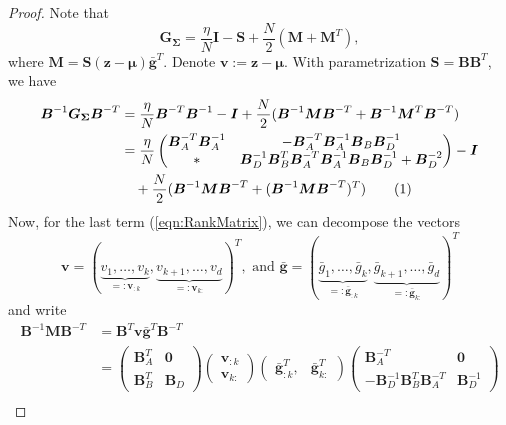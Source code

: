 \documentclass[a4paper, 11pt, oneside]{scrartcl}
\theoremstyle{break}
\newcommand{\matr}[1]{\boldsymbol{#1}}
\newcommand{\numberthis}{\addtocounter{equation}{1}\tag{\theequation}}
\numberwithin{equation}{section}
\begin{document}
					\begin{proof}
						Note that 
						$$\matr{G_{\Sigma}} = \frac{\eta}{N} \matr{I} - \matr{S} + \frac{N}{2} (\matr{M} + \matr{M}^T),$$
						where $\matr{M} = \matr{S} (\matr{z} - \matr{\mu}) \matr{\bar{g}}^T$.
						Denote $\matr{v} := \matr{z} - \matr{\mu}$.
						With parametrization $\matr{S} = \matr{B} \matr{B}^T$, we have
						\begin{align*}
							\matr{B}^{-1} \matr{G_{\Sigma}} \matr{B}^{-T} &= \frac{\eta}{N} \matr{B}^{-T} \matr{B}^{-1} - \matr{I} + \frac{N}{2} (\matr{B}^{-1} \matr{M} \matr{B}^{-T} + \matr{B}^{-1} \matr{M}^T \matr{B}^{-T}) \\
							&= \frac{\eta}{N} \begin{pmatrix} \matr{B}_A^{-T} \matr{B}_A^{-1} & -\matr{B}_A^{-T} \matr{B}_A^{-1} \matr{B}_B \matr{B}_D^{-1} \\ * & \matr{B}_D^{-1} \matr{B}_B^T \matr{B}_A^{-T} \matr{B}_A^{-1} \matr{B}_B \matr{B}_D^{-1} + \matr{B}_D^{-2} \end{pmatrix} - \matr{I} \\
							&\quad + \frac{N}{2} (\matr{B}^{-1} \matr{M} \matr{B}^{-T} + (\matr{B}^{-1} \matr{M} \matr{B}^{-T})^T) \numberthis{\label{eqn:RankMatrix}}
						\end{align*}
						Now, for the last term (\ref{eqn:RankMatrix}), we can decompose the vectors 
						$$\matr{v} = (\underbrace{v_1, \dots, v_{k}}_{=: \matr{v}_{:k}}, \underbrace{v_{k+1}, \dots, v_d}_{=:\matr{v}_{k:}})^T, \text{ and } \matr{\bar{g}} = (\underbrace{\bar{g}_1, \dots, \bar{g}_{k}}_{=: \matr{\bar{g}}_{:k}}, \underbrace{\bar{g}_{k+1}, \dots, \bar{g}_d}_{=:\matr{\bar{g}}_{k:}})^T$$
						and write
						\begin{align*}
							\matr{B}^{-1} \matr{M} \matr{B}^{-T} &= \matr{B}^T \matr{v} \matr{\bar{g}}^T \matr{B}^{-T} \\
							&= \begin{pmatrix} \matr{B}_A^T & \matr{0} \\ \matr{B}_B^T & \matr{B}_D \end{pmatrix} \begin{pmatrix} \matr{v}_{:k} \\ \matr{v}_{k:} \end{pmatrix} \begin{pmatrix} \matr{\bar{g}}_{:k}^T, & \matr{\bar{g}}_{k:}^T \end{pmatrix} \begin{pmatrix} \matr{B}_A^{-T} & \matr{0} \\ -\matr{B}_D^{-1} \matr{B}_B^T \matr{B}_A^{-T} & \matr{B}_D^{-1} \end{pmatrix} \\

\end{align*}
\end{proof}
\end{document}
